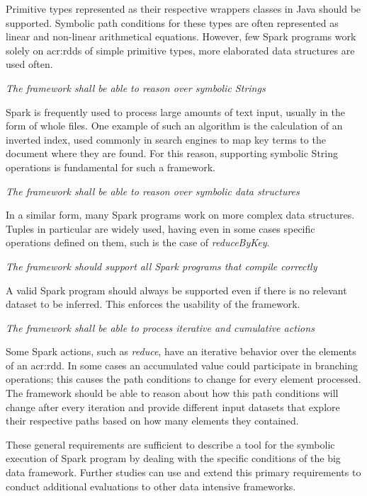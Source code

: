 \begin{itemize}
Primitive types represented as their respective wrappers classes in Java should be supported. Symbolic path conditions for these types are often represented as linear and non-linear arithmetical equations. However, few Spark programs work solely on \acrshort{acr:rdd}s of simple primitive types, more elaborated data structures are used often.
	
 \textit{The framework shall be able to reason over symbolic Strings}

Spark is frequently used to process large amounts of text input, usually in the form of whole files. One example of such an algorithm is the calculation of an inverted index, used commonly in search engines to map key terms to the document where they are found. For this reason, supporting symbolic String operations is fundamental for such a framework.
	
 \textit{The framework shall be able to reason over symbolic data structures}

In a similar form, many Spark programs work on more complex data structures. Tuples in particular are widely used, having even in some cases specific operations defined on them, such is the case of \textit{reduceByKey}.
	
 \textit{The framework should support all Spark programs that compile correctly}

A valid Spark program should always be supported even if there is no relevant dataset to be inferred. This enforces the usability of the framework.
	
 \textit{The framework shall be able to process iterative and cumulative actions}

Some Spark actions, such as \textit{reduce}, have an iterative behavior over the elements of an \acrshort{acr:rdd}. In some cases an accumulated value could participate in branching operations; this causes the path conditions to change for every element processed. The framework should be able to reason about how this path conditions will change after every iteration and provide different input datasets that explore their respective paths based on how many elements they contained.

\end{itemize}

These general requirements are sufficient to describe a tool for the symbolic execution of Spark program by dealing with the specific conditions of the big data framework. Further studies can use and extend this primary requirements to conduct additional evaluations to other data intensive frameworks. 

